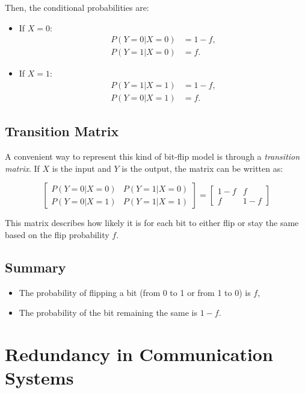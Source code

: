 \documentclass{article}
\begin{document}
Then, the conditional probabilities are:

\begin{itemize}
    \item If \( X = 0 \):
    \begin{align*}
    P(Y = 0 | X = 0) &= 1 - f, \\
    P(Y = 1 | X = 0) &= f.
    \end{align*}

    \item If \( X = 1 \):
    \begin{align*}
    P(Y = 1 | X = 1) &= 1 - f, \\
    P(Y = 0 | X = 1) &= f.
    \end{align*}
\end{itemize}

\subsection{Transition Matrix}

A convenient way to represent this kind of bit-flip model is through a \textit{transition matrix}. If \( X \) is the input and \( Y \) is the output, the matrix can be written as:

\[
\begin{bmatrix}
P(Y = 0 | X = 0) & P(Y = 1 | X = 0) \\
P(Y = 0 | X = 1) & P(Y = 1 | X = 1)
\end{bmatrix}
=
\begin{bmatrix}
1 - f & f \\
f & 1 - f
\end{bmatrix}
\]

This matrix describes how likely it is for each bit to either flip or stay the same based on the flip probability \( f \).

\subsection{Summary}

\begin{itemize}
    \item The probability of flipping a bit (from 0 to 1 or from 1 to 0) is \( f \),
    \item The probability of the bit remaining the same is \( 1 - f \).
\end{itemize}


\section{Redundancy in Communication Systems}
\end{document}
